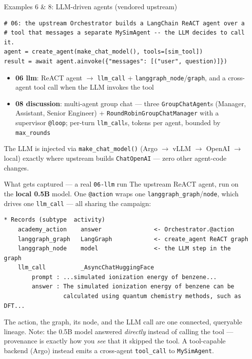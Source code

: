 \documentclass[aspectratio=169,11pt]{beamer}
\begin{document}
\begin{frame}[fragile]{Examples 6 \& 8: LLM-driven agents (vendored upstream)}
\begin{lstlisting}
# 06: the upstream Orchestrator builds a LangChain ReACT agent over a
# tool that messages a separate MySimAgent -- the LLM decides to call it.
agent = create_agent(make_chat_model(), tools=[sim_tool])
result = await agent.ainvoke({"messages": [("user", question)]})
\end{lstlisting}
  \begin{itemize}\small
    \item \textbf{06 llm}: ReACT agent $\to$ \texttt{llm\_call} +
      \texttt{langgraph\_node}/\texttt{graph}, and a cross-agent tool call when the
      LLM invokes the tool
    \item \textbf{08 discussion}: multi-agent group chat --- three
      \texttt{GroupChatAgent}s (Manager, Assistant, Senior Engineer) +
      \texttt{RoundRobinGroupChatManager} with a supervisor \texttt{@loop};
      per-turn \texttt{llm\_call}s, tokens per agent, bounded by \texttt{max\_rounds}
  \end{itemize}
  \small The LLM is injected via \texttt{make\_chat\_model()} (Argo $\to$ vLLM $\to$ OpenAI
  $\to$ local) exactly where upstream builds \texttt{ChatOpenAI} --- \alert{zero other agent-code changes}.
\end{frame}

\begin{frame}[fragile]{What gets captured --- a real \texttt{06-llm} run}
  \small The upstream ReACT agent, run on the \textbf{local 0.5B} model. One
  \texttt{@action} wraps one \texttt{langgraph\_graph}/\texttt{node}, which drives one
  \texttt{llm\_call} --- all sharing the campaign:
\begin{lstlisting}[style=sh]
* Records (subtype  activity)
    academy_action    answer               <- Orchestrator.@action
    langgraph_graph   LangGraph            <- create_agent ReACT graph
    langgraph_node    model                <- the LLM step in the graph
    llm_call          _AsyncChatHuggingFace
        prompt : ...simulated ionization energy of benzene...
        answer : The simulated ionization energy of benzene can be
                 calculated using quantum chemistry methods, such as DFT...
\end{lstlisting}
  \small The action, the graph, its node, and the LLM call are one connected,
  queryable lineage. \alert{Note}: the 0.5B model answered \emph{directly} instead of
  calling the tool --- provenance is exactly how you \emph{see} that it skipped the
  tool. A tool-capable backend (Argo) instead emits a cross-agent
  \texttt{tool\_call} to \texttt{MySimAgent}.
\end{frame}
\end{document}
